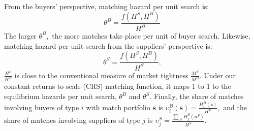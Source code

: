 \documentclass[12pt]{article} \usepackage{amsmath,amssymb,amsthm,geometry,graphicx,setspace,algorithm,algpseudocode,float}
\begin{document}
From the buyers' perspective, matching hazard per unit search is:
\begin{equation}
\theta ^{B}=\frac{f(H^{S},H^{B})}{H^{B}}  \label{theta_B}
\end{equation}
The larger $\theta ^{B},$ the more matches take place per unit of buyer search. Likewise, matching hazard per unit search from the suppliers' perspective is: 
\begin{equation}
\theta ^{S}=\frac{f(H^{S},H^{B})}{H^{S}}.  \label{theta_S}
\end{equation}%
$\frac{H^S}{H^B}$ is close to the conventional measure of market tightness $\frac{M^S}{M^B}$. Under our constant returns to scale (CRS) matching function, it maps 1 to 1 to the equilibrium hazards per unit search, $\theta^B$ and $\theta^S$.
Finally, the share of matches involving buyers of type $i$ with match portfolio $\mathbf{s}$ is  $
\upsilon _{i}^{B}(\mathbf{s})=\frac{H_{i}^{B}(\mathbf{s})}{H^{B}},$ 
and the share of matches involving suppliers of type $j$ is $\upsilon_{j}^{S} = \frac{\sum_{n^S} H_{j}^{S}(n^S)}{H^{S}}$. 
\end{document}
